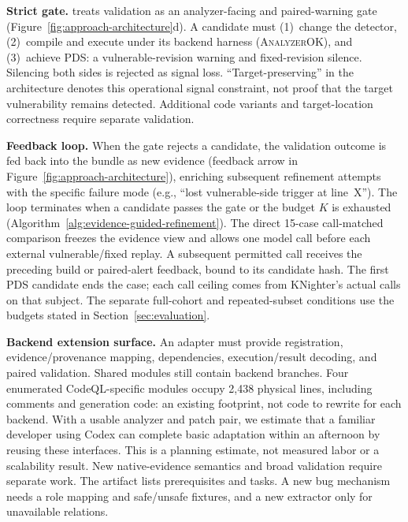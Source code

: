 \textbf{Strict gate.} \toolname treats validation as an analyzer-facing and paired-warning gate (Figure~\ref{fig:approach-architecture}d). A candidate must (1)~change the detector, (2)~compile and execute under its backend harness (\textsc{AnalyzerOK}), and (3)~achieve PDS: a vulnerable-revision warning and fixed-revision silence. Silencing both sides is rejected as signal loss. ``Target-preserving'' in the architecture denotes this operational signal constraint, not proof that the target vulnerability remains detected. Additional code variants and target-location correctness require separate validation.

\textbf{Feedback loop.}  When the gate rejects a candidate, the validation outcome is fed back into the bundle as new evidence (feedback arrow in Figure~\ref{fig:approach-architecture}), enriching subsequent refinement attempts with the specific failure mode (e.g., ``lost vulnerable-side trigger at line~X'').  The loop terminates when a candidate passes the gate or the budget $K$ is exhausted (Algorithm~\ref{alg:evidence-guided-refinement}).
The direct 15-case call-matched comparison freezes the evidence view and allows one model call before each external vulnerable/fixed replay. A subsequent permitted call receives the preceding build or paired-alert feedback, bound to its candidate hash. The first PDS candidate ends the case; each call ceiling comes from KNighter's actual calls on that subject. The separate full-cohort and repeated-subset conditions use the budgets stated in Section~\ref{sec:evaluation}.

\textbf{Backend extension surface.}
An adapter must provide registration, evidence/provenance mapping, dependencies, execution/result decoding, and paired validation. Shared modules still contain backend branches. Four enumerated CodeQL-specific modules occupy 2,438 physical lines, including comments and generation code: an existing footprint, not code to rewrite for each backend. With a usable analyzer and patch pair, we estimate that a familiar developer using Codex can complete basic adaptation within an afternoon by reusing these interfaces. This is a planning estimate, not measured labor or a scalability result. New native-evidence semantics and broad validation require separate work. The artifact lists prerequisites and tasks. A new bug mechanism needs a role mapping and safe/unsafe fixtures, and a new extractor only for unavailable relations.


